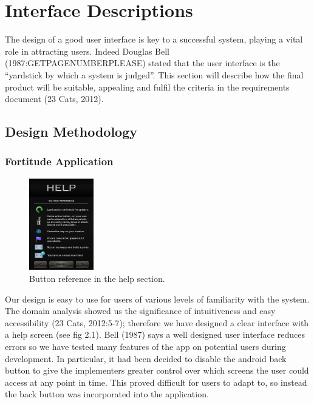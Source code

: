 \section{Interface Descriptions}
The design of a good user interface is key to a successful system, playing a vital role in attracting users. Indeed Douglas Bell (1987:GETPAGENUMBERPLEASE) stated that the user interface is the “yardstick by which a system is judged”. This section will describe how the final product will be suitable, appealing and fulfil the criteria in the requirements document (23 Cats, 2012).
\vspace{-10pt}
\subsection{Design Methodology}
\subsubsection{Fortitude Application}

\begin{figure}
	\vspace{-20pt}
	\begin{center}
	\includegraphics[width=0.25\textwidth]{images/help_mockup}
	\caption{Button reference in the help section.}
	\label{help_mockup}
	\end{center}
	\vspace{40pt}
\end{figure}

Our design is easy to use for users of various levels of familiarity with the system. The domain analysis showed us the significance of intuitiveness and easy accessibility (23 Cats, 2012:5-7); therefore we have designed a clear interface with a help screen (see fig 2.1). Bell (1987) says a well designed user interface reduces errors so we have tested many features of the app on potential users during development. In particular, it had been decided to disable the android back button to give the implementers greater control over which screens the user could access at any point in time. This proved difficult for users to adapt to, so instead the back button was incorporated into the application. 

